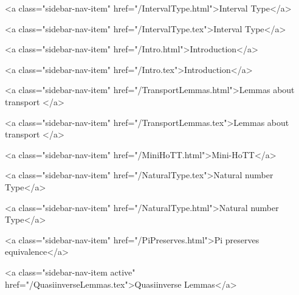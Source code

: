       
        
          <a class="sidebar-nav-item" href="/IntervalType.html">Interval Type</a>
        
      
    
      
        
          <a class="sidebar-nav-item" href="/IntervalType.tex">Interval Type</a>
        
      
    
      
        
          <a class="sidebar-nav-item" href="/Intro.html">Introduction</a>
        
      
    
      
        
          <a class="sidebar-nav-item" href="/Intro.tex">Introduction</a>
        
      
    
      
        
          <a class="sidebar-nav-item" href="/TransportLemmas.html">Lemmas about transport </a>
        
      
    
      
        
          <a class="sidebar-nav-item" href="/TransportLemmas.tex">Lemmas about transport </a>
        
      
    
      
        
          <a class="sidebar-nav-item" href="/MiniHoTT.html">Mini-HoTT</a>
        
      
    
      
        
          <a class="sidebar-nav-item" href="/NaturalType.tex">Natural number Type</a>
        
      
    
      
        
          <a class="sidebar-nav-item" href="/NaturalType.html">Natural number Type</a>
        
      
    
      
        
          <a class="sidebar-nav-item" href="/PiPreserves.html">Pi preserves equivalence</a>
        
      
    
      
        
          <a class="sidebar-nav-item active" href="/QuasiinverseLemmas.tex">Quasiinverse Lemmas</a>
        
